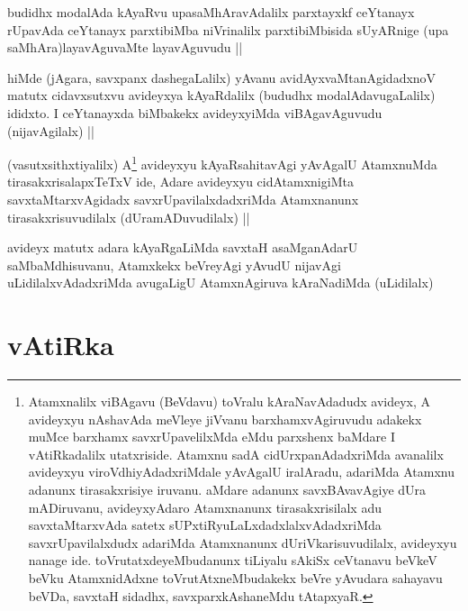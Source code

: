 
\begin{artha}
budidhx modalAda kAyaRvu upasaMhAravAdalilx parxtayxkf ceYtanayx rUpavAda ceYtanayx parxtibiMba niVrinalilx parxtibiMbisida sUyARnige (upa saMhAra)layavAguvaMte layavAguvudu ||
\end{artha}


\begin{artha}
hiMde (jAgara, savxpanx dashegaLalilx) yAvanu avidAyxvaMtanAgidadxnoV matutx cidavxsutxvu avideyxya kAyaRdalilx (bududhx modalAdavugaLalilx) ididxto. I ceYtanayxda biMbakekx avideyxyiMda viBAgavAguvudu (nijavAgilalx) ||
\end{artha}

\begin{artha}
(vasutxsithxtiyalilx) A\footnote{Atamxnalilx viBAgavu (BeVdavu) toVralu kAraNavAdadudx avideyx, A avideyxyu nAshavAda meVleye jiVvanu barxhamxvAgiruvudu adakekx muMce barxhamx savxrUpavelilxMda eMdu parxshenx baMdare I vAtiRkadalilx utatxriside. Atamxnu sadA cidUrxpanAdadxriMda avanalilx avideyxyu viroVdhiyAdadxriMdale yAvAgalU iralAradu, adariMda Atamxnu adanunx tirasakxrisiye iruvanu. aMdare adanunx savxBAvavAgiye dUra mADiruvanu, avideyxyAdaro Atamxnanunx tirasakxrisilalx adu savxtaMtarxvAda satetx sUPxtiRyuLaLxdadxlalxvAdadxriMda savxrUpavilalxdudx adariMda Atamxnanunx dUriVkarisuvudilalx, avideyxyu nanage ide. toVrutatxdeyeMbudanunx tiLiyalu sAkiSx ceVtanavu beVkeV beVku AtamxnidAdxne toVrutAtxneMbudakekx beVre yAvudara sahayavu beVDa, savxtaH sidadhx, savxparxkAshaneMdu tAtapxyaR.} avideyxyu kAyaRsahitavAgi yAvAgalU AtamxnuMda tirasakxrisalapxTeTxV ide, Adare avideyxyu cidAtamxnigiMta savxtaMtarxvAgidadx savxrUpavilalxdadxriMda Atamxnanunx tirasakxrisuvudilalx (dUramADuvudilalx) ||
\end{artha}


\begin{artha}
avideyx matutx adara kAyaRgaLiMda savxtaH asaMganAdarU saMbaMdhisuvanu, Atamxkekx beVreyAgi yAvudU nijavAgi uLidilalxvAdadxriMda avugaLigU AtamxnAgiruva kAraNadiMda (uLidilalx)
\end{artha}

\section*{vAtiRka}

